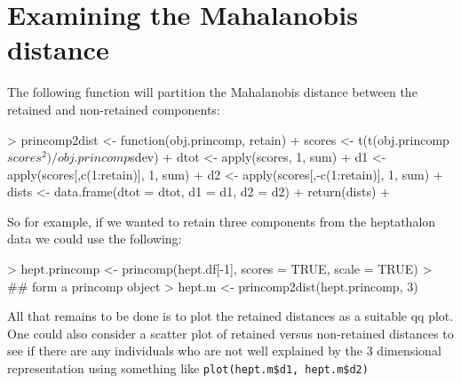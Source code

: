 \documentclass[11pt]{article}
\begin{document}
\section{Examining the Mahalanobis distance}

The following function will partition the Mahalanobis distance between the retained and non-retained components:

\begin{Schunk}
\begin{Sinput}
> princomp2dist <- function(obj.princomp, retain){
+  scores <- t(t(obj.princomp$scores^2) / obj.princomp$sdev)
+  dtot <- apply(scores, 1, sum)
+  d1 <- apply(scores[,c(1:retain)], 1, sum)
+  d2 <- apply(scores[,-c(1:retain)], 1, sum)
+  dists <- data.frame(dtot = dtot, d1 = d1, d2 = d2)
+  return(dists)
+ }
\end{Sinput}
\end{Schunk}


So for example, if we wanted to retain three components from the heptathalon data we could use the following:

\begin{Schunk}
\begin{Sinput}
> hept.princomp <- princomp(hept.df[-1], scores = TRUE, scale = TRUE)
> ## form a princomp object
> hept.m <- princomp2dist(hept.princomp, 3)
\end{Sinput}
\end{Schunk}


All that remains to be done is to plot the retained distances as a suitable qq plot.   One could also consider a scatter plot of retained versus non-retained distances to see if there are any individuals who are not well explained by the 3 dimensional representation using something like \verb+plot(hept.m$d1, hept.m$d2)+
\end{document}
